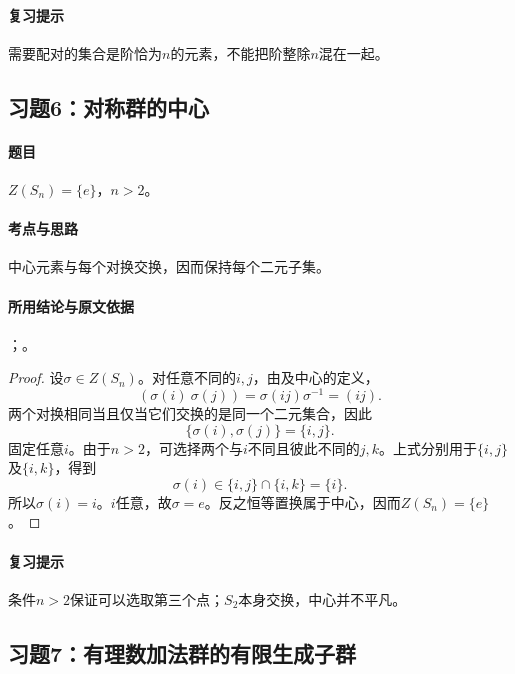\paragraph{复习提示}
需要配对的集合是阶恰为$n$的元素，不能把阶整除$n$混在一起。


\subsection{习题6：\texorpdfstring{对称群的中心}{对称群的中心}}
\label{ex:2:6}

\paragraph{题目}
$Z(S_n)=\{e\}$，$n>2$。

\paragraph{考点与思路}
中心元素与每个对换交换，因而保持每个二元子集。

\paragraph{所用结论与原文依据}
；。


\begin{proof}
设$\sigma\in Z(S_n)$。对任意不同的$i,j$，由及中心的定义，
\[
(\sigma(i)\ \sigma(j))=\sigma(ij)\sigma^{-1}=(ij).
\]
两个对换相同当且仅当它们交换的是同一个二元集合，因此
\[
\{\sigma(i),\sigma(j)\}=\{i,j\}.
\]
固定任意$i$。由于$n>2$，可选择两个与$i$不同且彼此不同的$j,k$。上式分别用于$\{i,j\}$及$\{i,k\}$，得到
\[
\sigma(i)\in\{i,j\}\cap\{i,k\}=\{i\}.
\]
所以$\sigma(i)=i$。$i$任意，故$\sigma=e$。反之恒等置换属于中心，因而$Z(S_n)=\{e\}$。
\end{proof}

\paragraph{复习提示}
条件$n>2$保证可以选取第三个点；$S_2$本身交换，中心并不平凡。


\subsection{习题7：\texorpdfstring{有理数加法群的有限生成子群}{有理数加法群的有限生成子群}}
\label{ex:2:7}


